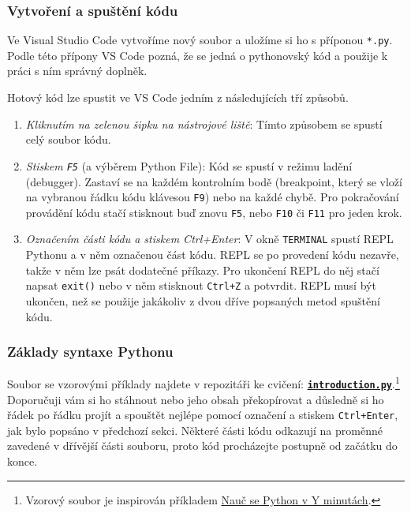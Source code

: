 \documentclass[a4paper,11pt,twoside]{article}
\def\code#1{\textnormal{\texttt{#1}}}
\def\ghfile#1#2{\textnormal{\textbf{\texttt{\href{https://github.com/PavelStransky/PCInPhysics2021/blob/main/#1#2}{#2}}}}}
\def\abbreviation#1{\textnormal{\textsc{#1}}}
\theoremstyle{red}
\theoremstyle{green}
\begin{document}
\subsubsection{Vytvoření a spuštění kódu}
    Ve Visual Studio Code vytvoříme nový soubor a uložíme si ho s příponou \code{*.py}. 
    Podle této přípony VS Code pozná, že se jedná o pythonovský kód a použije k práci s ním správný doplněk.
       
    Hotový kód lze spustit ve VS Code jedním z následujících tří způsobů.
    \begin{enumerate}
        \item 
            \emph{Kliknutím na zelenou šipku na nástrojové liště}:
            Tímto způsobem se spustí celý soubor kódu.
        \item
            \emph{Stiskem \code{F5}} (a výběrem Python File): Kód se spustí v režimu ladění (debugger).
            Zastaví se na každém kontrolním bodě (breakpoint, který se vloží na vybranou řádku kódu klávesou \code{F9}) nebo na každé chybě.
            Pro pokračování provádění kódu stačí stisknout buď znovu \code{F5}, nebo \code{F10} či \code{F11} pro jeden krok.

        \item
            \emph{Označením části kódu a stiskem Ctrl+Enter}: V okně \code{TERMINAL} spustí \abbreviation{REPL} Pythonu a v něm označenou část kódu.
            \abbreviation{REPL} se po provedení kódu nezavře, takže v něm lze psát dodatečné příkazy.
            Pro ukončení \abbreviation{REPL} do něj stačí napsat \code{exit()} nebo v něm stisknout \code{Ctrl+Z} a potvrdit.
            \abbreviation{REPL} musí být ukončen, než se použije jakákoliv z dvou dříve popsaných metod spuštění kódu.
    \end{enumerate}

\subsubsection{Základy syntaxe Pythonu}
    Soubor se vzorovými příklady najdete v repozitáři ke cvičení: \ghfile{python/basics/}{introduction.py}.\footnote{
        Vzorový soubor je inspirován příkladem \href{https://learnxinyminutes.com/docs/cs-cz/python/}{Nauč se Python v Y minutách}.
    }
    Doporučuji vám si ho stáhnout nebo jeho obsah překopírovat a důsledně si ho řádek po řádku projít a spouštět nejlépe pomocí označení a stiskem \code{Ctrl+Enter}, jak bylo popsáno v předchozí sekci.
    Některé části kódu odkazují na proměnné zavedené v dřívější části souboru, proto kód procházejte postupně od začátku do konce.
\end{document}
